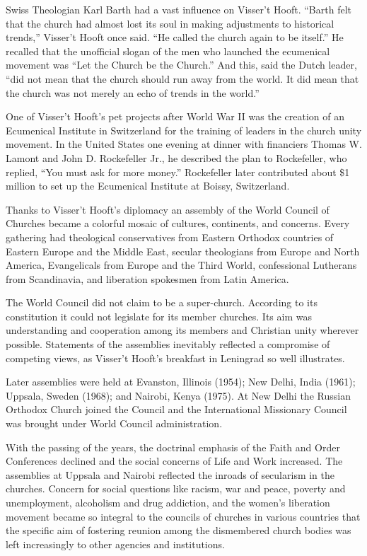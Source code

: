 Swiss Theologian Karl Barth had a vast influence on Visser’t Hooft. “Barth felt that the church had
almost lost its soul in making adjustments to historical trends,” Visser’t Hooft once said. “He
called the church again to be itself.” He recalled that the unofficial slogan of the men who
launched the ecumenical movement was “Let the Church be the Church.” And this, said the Dutch
leader, “did not mean that the church should run away from the world. It did mean that the church
was not merely an echo of trends in the world.”

One of Visser’t Hooft’s pet projects after World War II was the creation of an Ecumenical Institute
in Switzerland for the training of leaders in the church unity movement. In the United States one
evening at dinner with financiers Thomas W. Lamont and John D. Rockefeller Jr., he described the
plan to Rockefeller, who replied, “You must ask for more money.” Rockefeller later contributed about
\$1 million to set up the Ecumenical Institute at Boissy, Switzerland.

Thanks to Visser’t Hooft’s diplomacy an assembly of the World Council of Churches became a colorful
mosaic of cultures, continents, and concerns. Every gathering had theological conservatives from
Eastern Orthodox countries of Eastern Europe and the Middle East, secular theologians from Europe
and North America, Evangelicals from Europe and the Third World, confessional Lutherans from
Scandinavia, and liberation spokesmen from Latin America.

The World Council did not claim to be a super-church. According to its constitution it could not
legislate for its member churches. Its aim was understanding and cooperation among its members and
Christian unity wherever possible. Statements of the assemblies inevitably reflected a compromise of
competing views, as Visser’t Hooft’s breakfast in Leningrad so well illustrates.

Later assemblies were held at Evanston, Illinois (1954); New Delhi, India (1961); Uppsala, Sweden
(1968); and Nairobi, Kenya (1975). At New Delhi the Russian Orthodox Church joined the Council and
the International Missionary Council was brought under World Council administration.

With the passing of the years, the doctrinal emphasis of the Faith and Order Conferences declined
and the social concerns of Life and Work increased. The assemblies at Uppsala and Nairobi reflected
the inroads of secularism in the churches. Concern for social questions like racism, war and peace,
poverty and unemployment, alcoholism and drug addiction, and the women’s liberation movement became
so integral to the councils of churches in various countries that the specific aim of fostering
reunion among the dismembered church bodies was left increasingly to other agencies and
institutions.

